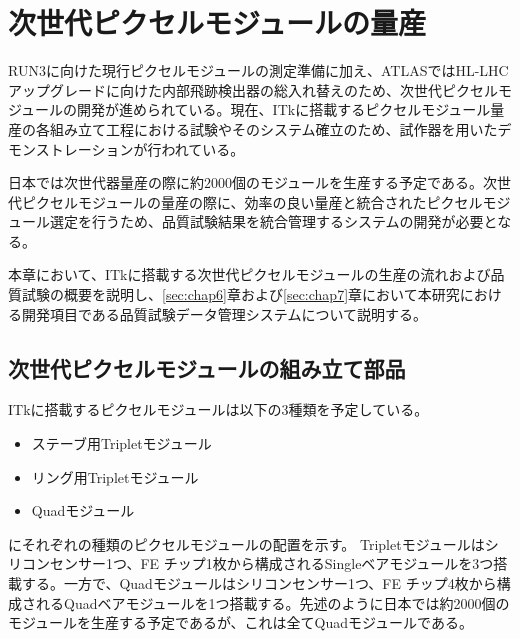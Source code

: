 \chapter{次世代ピクセルモジュールの量産}
\label{sec:singatapixel-devel}
RUN3に向けた現行ピクセルモジュールの測定準備に加え、ATLASではHL-LHCアップグレードに向けた内部飛跡検出器の総入れ替えのため、次世代ピクセルモジュールの開発が進められている。現在、ITkに搭載するピクセルモジュール量産の各組み立て工程における試験やそのシステム確立のため、試作器を用いたデモンストレーションが行われている。

日本では次世代器量産の際に約$2000$個のモジュールを生産する予定である。次世代ピクセルモジュールの量産の際に、効率の良い量産と統合されたピクセルモジュール選定を行うため、品質試験結果を統合管理するシステムの開発が必要となる。

本章において、ITkに搭載する次世代ピクセルモジュールの生産の流れおよび品質試験の概要を説明し、\ref{sec:chap6}章および\ref{sec:chap7}章において本研究における開発項目である品質試験データ管理システムについて説明する。

\section{次世代ピクセルモジュールの組み立て部品}
\label{sec:component}

ITkに搭載するピクセルモジュールは以下の3種類を予定している。
\begin{itemize}
  \item ステーブ用Tripletモジュール
  \item リング用Tripletモジュール
  \item Quadモジュール
\end{itemize}

にそれぞれの種類のピクセルモジュールの配置を示す。
Tripletモジュールはシリコンセンサー1つ、FE チップ1枚から構成されるSingleベアモジュールを3つ搭載する。一方で、Quadモジュールはシリコンセンサー1つ、FE チップ4枚から構成されるQuadベアモジュールを1つ搭載する。先述のように日本では約2000個のモジュールを生産する予定であるが、これは全てQuadモジュールである。


